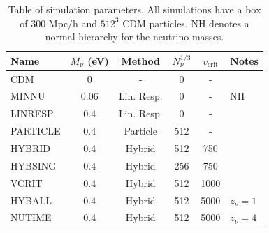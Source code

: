 \documentclass[useAMS, usenatbib]{mnras}
\begin{document}
\begin{table}
\begin{center}
\begin{tabular}{|l|c|c|c|c|l|}
\hline
    Name & $M_\nu$ (eV) & Method & $N_\nu^{1/3}$ & $v_\mathrm{crit}$ & Notes \\
\hline
CDM    &       0             &    -          & 0         & - &    \\
MINNU    &     0.06            &   Lin. Resp.    & 0         & - &  NH  \\
LINRESP    &     0.4             &   Lin. Resp.    & 0         & - &    \\
PARTICLE    &     0.4             &   Particle    & 512       & - &    \\
HYBRID    &     0.4             &   Hybrid      & 512       & 750 & \\
HYBSING    &     0.4             &   Hybrid      & 256       & 750 & \\
VCRIT    &     0.4             &   Hybrid      & 512       & 1000 & \\
HYBALL    &     0.4             &   Hybrid      & 512       & 5000 & $z_\nu = 1$ \\
NUTIME    &     0.4             &   Hybrid      & 512       & 5000 & $z_\nu = 4$  \\
\hline
\end{tabular}
\end{center}
\caption{Table of simulation parameters. All simulations have a box of $300$ Mpc/h
and $512^3$ CDM particles. NH denotes a normal hierarchy for the neutrino masses.
}
\label{tab:simulations}
\end{table}
\end{document}
